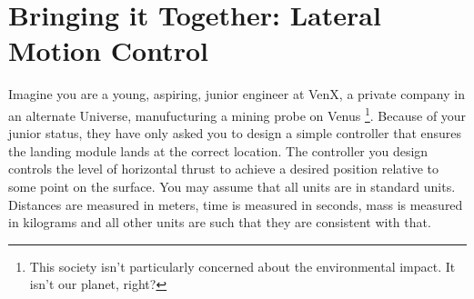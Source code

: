 \chapter{Bringing it Together: Lateral Motion Control}\label{Lab:3}
Imagine you are a young, aspiring, junior engineer at VenX, a private company in an alternate Universe, manufucturing a mining probe on Venus%
\footnote{This society isn't particularly concerned about the environmental impact. It isn't our planet, right?}.
Because of your junior status, they have only asked you to design a simple controller that ensures the landing module lands at the correct location.
The controller you design controls the level of horizontal thrust to achieve a desired position relative to some point on the surface.
You may assume that all units are in standard units.
Distances are measured in meters, time is measured in seconds, mass is measured in kilograms and all other units are such that they are consistent with that.

